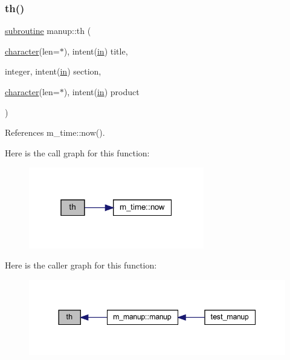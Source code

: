 \subsubsection{\texorpdfstring{th()}{th()}}
{\footnotesize\ttfamily \hyperlink{M__stopwatch_83_8txt_acfbcff50169d691ff02d4a123ed70482}{subroutine} manup\+::th (\begin{DoxyParamCaption}\item[{\hyperlink{option__stopwatch_83_8txt_abd4b21fbbd175834027b5224bfe97e66}{character}(len=$\ast$), intent(\hyperlink{M__journal_83_8txt_afce72651d1eed785a2132bee863b2f38}{in})}]{title,  }\item[{integer, intent(\hyperlink{M__journal_83_8txt_afce72651d1eed785a2132bee863b2f38}{in})}]{section,  }\item[{\hyperlink{option__stopwatch_83_8txt_abd4b21fbbd175834027b5224bfe97e66}{character}(len=$\ast$), intent(\hyperlink{M__journal_83_8txt_afce72651d1eed785a2132bee863b2f38}{in})}]{product }\end{DoxyParamCaption})}



References m\+\_\+time\+::now().

Here is the call graph for this function\+:
\nopagebreak
\begin{figure}[H]
\begin{center}
\leavevmode
\includegraphics[width=217pt]{manup_8f90_ad056917b9c1db52352c327beadced6d0_cgraph}
\end{center}
\end{figure}
Here is the caller graph for this function\+:
\nopagebreak
\begin{figure}[H]
\begin{center}
\leavevmode
\includegraphics[width=344pt]{manup_8f90_ad056917b9c1db52352c327beadced6d0_icgraph}
\end{center}
\end{figure}
